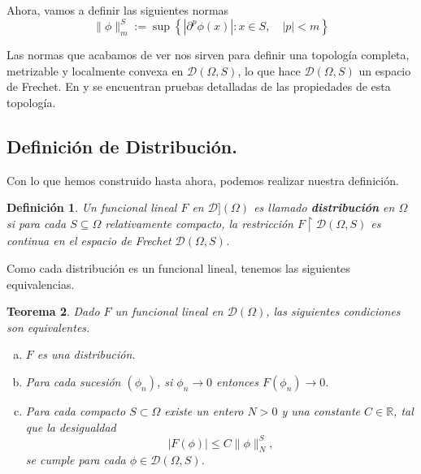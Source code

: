 \documentclass[letter,12pt]{article}
\newcommand\norm[1]{\lVert#1\rVert}
\newtheorem{theorem}{Teorema}
\newtheorem{definition}[theorem]{Definición}
\begin{document}
Ahora, vamos a definir las siguientes normas
\begin{equation}
 	\norm{\phi}^{S}_{m} := 
 	\sup{ \left\{ |\partial^p{\phi(x)}|: x\in S, \quad |p| < m  \right\} }
\end{equation}

Las normas que acabamos de ver nos sirven para definir una topología completa, 
metrizable y localmente convexa en $ \mathscr{D}(\Omega, S) $, lo que hace 
$ \mathscr{D}(\Omega, S) $ un espacio de Frechet. En \cite{Edwards} y \cite{Rudin}
se encuentran pruebas detalladas de las propiedades de esta topología.

\subsection{Definición de Distribución.}

Con lo que hemos construido hasta ahora, podemos realizar nuestra definición.

\begin{definition}\normalfont
	Un funcional lineal $ F $ en $ \mathscr{D}](\Omega) $ es llamado
	\textbf{distribución} en $ \Omega $ si para cada $ S\subseteq\Omega $ relativamente
	compacto, la restricción $ F\restriction{\mathscr{D}(\Omega, S)} $ es continua en
	el espacio de Frechet $ \mathscr{D}(\Omega, S) $.
\end{definition}

Como cada distribución es un funcional lineal, tenemos las siguientes equivalencias.
\begin{theorem}\label{col:equiv}\normalfont
	Dado $ F $ un funcional lineal en $ \mathscr{D}(\Omega) $, las siguientes
	condiciones son equivalentes.
	\begin{enumerate}[(a)]
		\item $ F $ es una distribución.
		\item Para cada sucesión $ (\phi_n) $, si $ \phi_n \to 0 $ entonces
		$ F(\phi_n) \to 0 $.
		\item Para cada compacto $ S\subset\Omega $ existe un entero
		$ N > 0 $  y una constante $ C \in \mathbb{R} $, tal que la
		desigualdad
		\begin{equation}
			|F(\phi)| \leq C \norm{\phi}^S_N,
		\end{equation}
		se cumple para cada $ \phi \in \mathscr{D}(\Omega, S)$.
	\end{enumerate}
\end{theorem}
\end{document}

